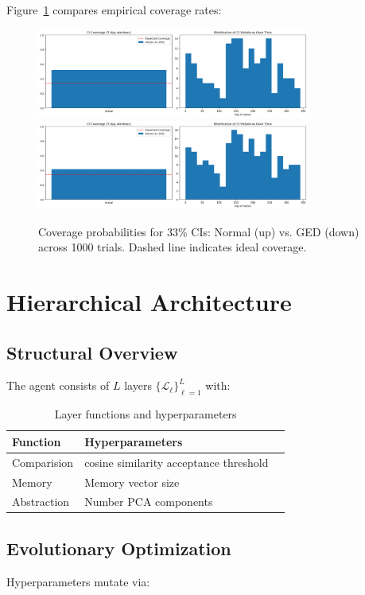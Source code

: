 \documentclass[12pt]{article}
\begin{document}
Figure~\ref{fig:ci} compares empirical coverage rates:

\begin{figure}[h]
    \centering
    \includegraphics[width=0.8\textwidth]{NORM.png}
    \includegraphics[width=0.8\textwidth]{GED.png}
    \caption{Coverage probabilities for 33\% CIs: Normal (up) vs. GED (down) across 1000 trials. Dashed line indicates ideal coverage.}
    \label{fig:ci}
\end{figure}

\section{Hierarchical Architecture}
\label{sec:architecture}

\subsection{Structural Overview}
The agent consists of $L$ layers $\{\mathscr{L}_\ell\}_{\ell=1}^L$ with:

\begin{table}[h]
\centering
\caption{Layer functions and hyperparameters}
\label{tab:layers}
\begin{tabular}{lll}
\toprule
\textbf{Function} & \textbf{Hyperparameters} \\
\midrule
Comparision & cosine similarity acceptance threshold \\
Memory & Memory vector size \\
Abstraction & Number PCA components \\
\bottomrule
\end{tabular}
\end{table}

\subsection{Evolutionary Optimization}
Hyperparameters mutate via:
\end{document}
